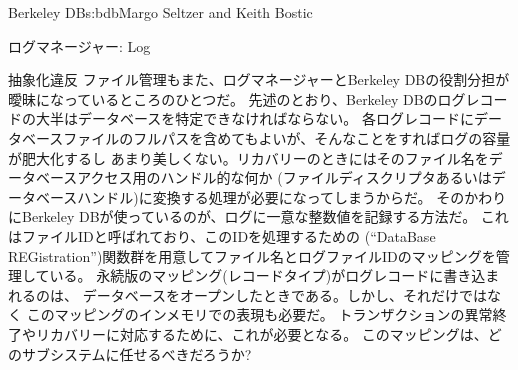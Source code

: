 \begin{aosachapter}{Berkeley DB}{s:bdb}{Margo Seltzer and Keith Bostic}
\begin{aosasect1}{ログマネージャー: Log}
\begin{aosasect2}{抽象化違反}
ファイル管理もまた、ログマネージャーとBerkeley DBの役割分担が曖昧になっているところのひとつだ。
先述のとおり、Berkeley DBのログレコードの大半はデータベースを特定できなければならない。
各ログレコードにデータベースファイルのフルパスを含めてもよいが、そんなことをすればログの容量が肥大化するし
あまり美しくない。リカバリーのときにはそのファイル名をデータベースアクセス用のハンドル的な何か
(ファイルディスクリプタあるいはデータベースハンドル)に変換する処理が必要になってしまうからだ。
そのかわりにBerkeley DBが使っているのが、ログに一意な整数値を記録する方法だ。
これはファイルIDと呼ばれており、このIDを処理するための
(``DataBase REGistration'')関数群を用意してファイル名とログファイルIDのマッピングを管理している。
永続版のマッピング(レコードタイプ)がログレコードに書き込まれるのは、
データベースをオープンしたときである。しかし、それだけではなく
このマッピングのインメモリでの表現も必要だ。
トランザクションの異常終了やリカバリーに対応するために、これが必要となる。
このマッピングは、どのサブシステムに任せるべきだろうか?


\end{aosasect2}
\end{aosasect1}
\end{aosachapter}
